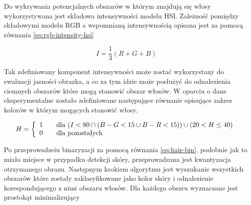 Do wykrywania potencjalnych obszarów w którym znajdują się włosy wykorzystywana
jest składowa intensywności modelu HSI. Zależność pomiędzy składowymi modelu RGB
a wspomnianą intensywnością opisana jest za pomocą równania
\ref{eq:rgb-intensity-hsi}

\begin{equation}
	\label{eq:rgb-intensity-hsi}
	I = \frac{1}{3}\left(R+G+B\right)
\end{equation}

Tak zdefiniowany komponent intensywności może zostać wykorzystany do ewaluacji
jasności obrazka, a co za tym idzie może posłużyć do odnalezienia ciemnych
obszarów które mogą stanowić obszar włosów. W oparciu o dane eksperymentalne
zostało zdefiniowane następujące równanie opisujące zakres
kolorów w którym mogących stanowić włosy. 

\begin{equation}
\label{eq:hair-bin}
H = \left\{ 
\begin{array}{l l}
  1 & \quad \mbox{dla $\left( I < 80 \cap \left(B - G < 15 \cup B - R < 15
  \right) \right) \cup  \left( 20 < H \leq 40 \right) $} \\ 0 & \quad
  \mbox{dla pozostałych}\\ \end{array} \right.
\end{equation}

Po przeprowadzeiu binaryzacji za pomocą równania \ref{eq:hair-bin},  podobnie
jak to miało miejsce w przypadku detekcji skóry, przeprowadzana jest kwantyzacja
otrzymanego obrazu. Następnym krokiem algorytmu jest wyszukanie wszystkich
obszarów które zostały zaklasyfikowane jako kolor skóry i odnalezienie
korespondującego z nimi obszaru włosów. Dla każdego obszru wyznaczane jest
prostokąt minimalizujący 
